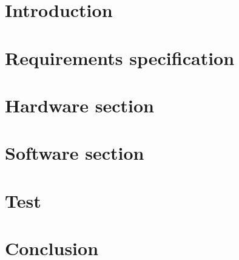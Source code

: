 



\renewcommand\chaptername{Chapter}
\renewcommand\contentsname{Table of Contents}
\renewcommand\figurename{Figure}
\renewcommand\tablename{Table} 


\cleardoublepage

\frontmatter




\cleardoublepage

\tableofcontents*
\newpage
\printnomenclature
\renewcommand*\listfigurename{List of Figures}
\renewcommand*\listtablename{List of Tables}

\mainmatter
\chapter{Introduction}

\chapter{Requirements specification}

\chapter{Hardware section}
%


\chapter{Software section}
%


\chapter{Test}

\chapter{Conclusion}

